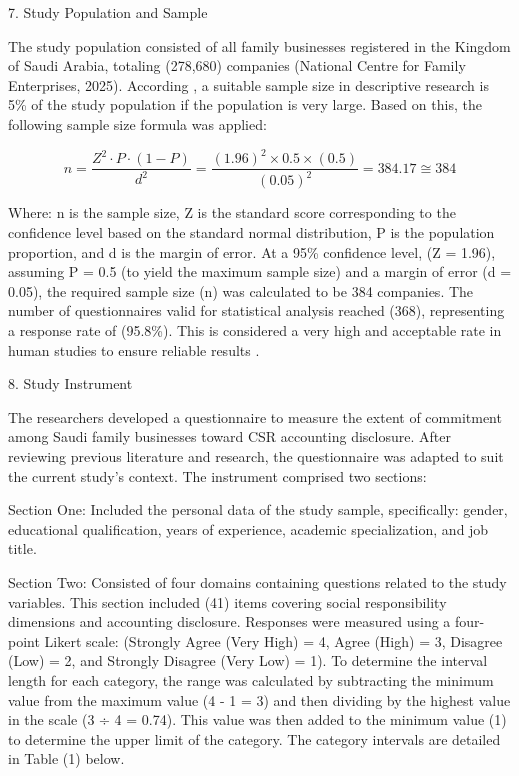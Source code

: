 \documentclass{default}
\begin{document}
7. Study Population and Sample

The study population consisted of all family businesses registered in the Kingdom of Saudi Arabia, totaling (278,680) companies (National Centre for Family Enterprises, 2025). According \cite{ref33}, a suitable sample size in descriptive research is 5\% of the study population if the population is very large. Based on this, the following sample size formula was applied:

\begin{equation}
n = \frac{Z^{2} \cdot P \cdot (1 - P)}{d^{2}} = \frac{(1.96)^{2} \times 0.5 \times (0.5)}{(0.05)^{2}} = 384.17 \cong 384

\end{equation}

Where: n is the sample size, Z is the standard score corresponding to the confidence level based on the standard normal distribution, P is the population proportion, and d is the margin of error. At a 95\% confidence level, (Z = 1.96), assuming P = 0.5 (to yield the maximum sample size) and a margin of error (d = 0.05), the required sample size (n) was calculated to be 384 companies. The number of questionnaires valid for statistical analysis reached (368), representing a response rate of (95.8\%). This is considered a very high and acceptable rate in human studies to ensure reliable results \citep{ref34}.

8. Study Instrument

The researchers developed a questionnaire to measure the extent of commitment among Saudi family businesses toward CSR accounting disclosure. After reviewing previous literature and research, the questionnaire was adapted to suit the current study's context. The instrument comprised two sections:

Section One: Included the personal data of the study sample, specifically: gender, educational qualification, years of experience, academic specialization, and job title.

Section Two: Consisted of four domains containing questions related to the study variables. This section included (41) items covering social responsibility dimensions and accounting disclosure. Responses were measured using a four-point Likert scale: (Strongly Agree (Very High) = 4, Agree (High) = 3, Disagree (Low) = 2, and Strongly Disagree (Very Low) = 1). To determine the interval length for each category, the range was calculated by subtracting the minimum value from the maximum value (4 - 1 = 3) and then dividing by the highest value in the scale (3 ÷ 4 = 0.74). This value was then added to the minimum value (1) to determine the upper limit of the category. The category intervals are detailed in Table (1) below.
\end{document}
